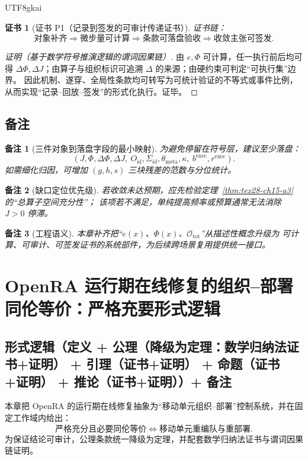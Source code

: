 \documentclass[12pt]{article}
\newtheorem{remark}{备注}[section]
\newtheorem{Certificate}{证书}[section]
\begin{document}
\begin{CJK*}{UTF8}{gkai}
\begin{Certificate}[证书 P1（记录到签发的可审计传递证书）]
\label{cert:tex28-ch15-p1}
证书链：
\[
  \text{对象补齐}
  \Rightarrow
  \text{微步量可计算}
  \Rightarrow
  \text{条款可落盘验收}
  \Rightarrow
  \text{收敛主张可签发}.
\]
\end{Certificate}

\begin{proof}[证明（基于数学符号推演逻辑的谓词因果链）]
由 $e,\Phi$ 可计算，任一执行前后均可得 $\Delta\Phi,\Delta J$；由算子与组织标识可追溯
$\Delta$ 的来源；由硬约束可判定“可执行集”边界。
因此机制、遂穿、全局性条款均可转写为可统计验证的不等式或事件比例，
从而实现“记录--回放--签发”的形式化执行。证毕。
\end{proof}

\subsection{备注}
\label{subsec:tex28-ch15-remarks}

\begin{remark}[三件对象到落盘字段的最小映射]
为避免停留在符号层，建议至少落盘：
\[
  (J,\Phi,\Delta\Phi,\Delta J,\ O_{\mathrm{id}},\Sigma_{\mathrm{id}},\theta_{\mathrm{meta}},\kappa,\ b^{\mathrm{exec}},
    r^{\mathrm{exec}}).
\]
如需细化归因，可增加 $(g,h,s)$ 三块残差的范数与分位统计。
\end{remark}

\begin{remark}[缺口定位优先级]
若收敛未达预期，应先检验定理~\ref{thm:tex28-ch15-a3} 的“总算子空间充分性”；
该项若不满足，单纯提高频率或预算通常无法消除 $J>0$ 停滞。
\end{remark}

\begin{remark}[工程语义]
本章补齐把“$e(x)$、$\Phi(x)$、$\mathcal O_{\mathrm{tot}}$”从描述性概念升级为
可计算、可审计、可签发证书的系统部件，为后续跨场景复用提供统一接口。
\end{remark}

\section{OpenRA 运行期在线修复的组织--部署同伦等价：严格充要形式逻辑}
\label{sec:tex28-ch16}

\subsection{形式逻辑（定义 + 公理（降级为定理：数学归纳法证书+证明） + 引理（证书+证明） + 命题（证书+证明） + 推论（证书+证明））+ 备注}
\label{subsec:tex28-ch16-logic}
本章把 OpenRA 的运行期在线修复抽象为“移动单元组织--部署”控制系统，并在固定工作域内给出：
\[
  \text{严格充分且必要同伦等价}
  \Longleftrightarrow
  \text{移动单元重编队与重部署}.
\]
为保证结论可审计，公理条款统一降级为定理，并配套数学归纳法证书与谓词因果链证明。


\end{CJK*}
\end{document}
